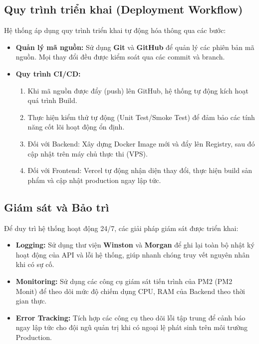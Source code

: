 \subsection{Quy trình triển khai (Deployment Workflow)}
\label{subsec:impl_workflow}

Hệ thống áp dụng quy trình triển khai tự động hóa thông qua các bước:
\begin{itemize}
    \item \textbf{Quản lý mã nguồn:} Sử dụng \textbf{Git} và \textbf{GitHub} để quản lý các phiên bản mã nguồn. Mọi thay đổi đều được kiểm soát qua các commit và branch.
    \item \textbf{Quy trình CI/CD:} 
    \begin{enumerate}
        \item Khi mã nguồn được đẩy (push) lên GitHub, hệ thống tự động kích hoạt quá trình Build.
        \item Thực hiện kiểm thử tự động (Unit Test/Smoke Test) để đảm bảo các tính năng cốt lõi hoạt động ổn định.
        \item Đối với Backend: Xây dựng Docker Image mới và đẩy lên Registry, sau đó cập nhật trên máy chủ thực thi (VPS).
        \item Đối với Frontend: Vercel tự động nhận diện thay đổi, thực hiện build sản phẩm và cập nhật production ngay lập tức.
    \end{enumerate}
\end{itemize}

\subsection{Giám sát và Bảo trì}
\label{subsec:impl_monitoring}

Để duy trì hệ thống hoạt động 24/7, các giải pháp giám sát được triển khai:
\begin{itemize}
    \item \textbf{Logging:} Sử dụng thư viện \textbf{Winston} và \textbf{Morgan} để ghi lại toàn bộ nhật ký hoạt động của API và lỗi hệ thống, giúp nhanh chóng truy vết nguyên nhân khi có sự cố.
    \item \textbf{Monitoring:} Sử dụng các công cụ giám sát tiến trình của PM2 (PM2 Monit) để theo dõi mức độ chiếm dụng CPU, RAM của Backend theo thời gian thực.
    \item \textbf{Error Tracking:} Tích hợp các công cụ theo dõi lỗi tập trung để cảnh báo ngay lập tức cho đội ngũ quản trị khi có ngoại lệ phát sinh trên môi trường Production.
\end{itemize}


